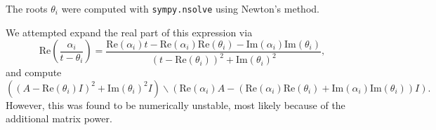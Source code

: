 The roots $\theta_i$ were computed with \texttt{sympy.nsolve} using Newton's
method.

We attempted expand the real part of this expression via
\begin{equation}
\mathrm{Re}\left(\frac{\alpha_i}{t - \theta_i}\right) = \frac{\mathrm{Re}{(\alpha_{i})}t - \mathrm{Re}{(\alpha_{i})} \mathrm{Re}{(\theta_{i})} - \mathrm{Im}{(\alpha_{i})} \mathrm{Im}{(\theta_{i})}}{\left(t - \mathrm{Re}{(\theta_{i})}\right)^{2} + \mathrm{Im}{(\theta_{i})}^{2}},
\end{equation}
and compute
\begin{equation}
\left(\left(A - \mathrm{Re}{(\theta_{i})I}\right)^{2} +
  \mathrm{Im}{(\theta_{i})}^{2}I\right)\backslash \left(\mathrm{Re}{(\alpha_{i})}A - (\mathrm{Re}{(\alpha_{i})} \mathrm{Re}{(\theta_{i})} + \mathrm{Im}{(\alpha_{i})} \mathrm{Im}{(\theta_{i})})I\right).
\end{equation}
However, this was found to be numerically unstable, most likely because of the
additional matrix power. %
